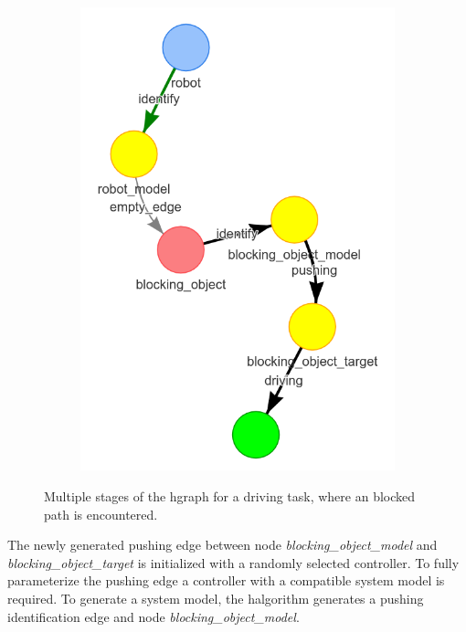 \begin{figure}[H]
\begin{subfigure}{.3\textwidth}
    \caption{}\label{subfig:blocking_obj_2}
  \end{subfigure}
  \begin{subfigure}{.3\textwidth}
    \centering
    \includegraphics[width=\textwidth]{figures/proposed_method/connecting_nodes/blocking_obj/blocking_obj_3}
    \caption{}\label{subfig:blocking_obj_3}
  \end{subfigure}

  \caption{Multiple stages of the \ac{hgraph} for a driving task, where an blocked path is encountered.}%
  \label{fig:blocking_obj_hgraph_one}

\end{figure}

The newly generated pushing edge between node \textit{blocking\_object\_model} and \textit{blocking\_object\_target} is initialized with a randomly selected controller. To fully parameterize the pushing edge a controller with a compatible system model is required. To generate a system model, the \ac{halgorithm} generates a pushing identification edge and node \textit{blocking\_object\_model}.\bs

